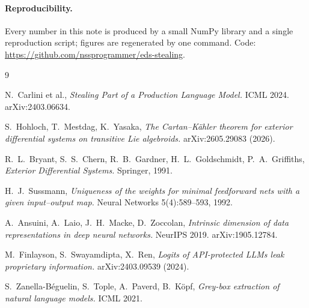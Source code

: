 \documentclass[11pt]{article}
\begin{document}
\paragraph{Reproducibility.} Every number in this note is produced by a small
NumPy library and a single reproduction script; figures are regenerated by one
command. Code: \url{https://github.com/nssprogrammer/eds-stealing}.

\begin{thebibliography}{9}

\label{ref:carlini}
N.~Carlini et al.,
\textit{Stealing Part of a Production Language Model.}
ICML 2024. arXiv:2403.06634.

\label{ref:eds}
S.~Hohloch, T.~Mestdag, K.~Yasaka,
\textit{The Cartan--K\"ahler theorem for exterior differential systems on
transitive Lie algebroids.} arXiv:2605.29083 (2026).

\label{ref:bryant}
R.~L.~Bryant, S.~S.~Chern, R.~B.~Gardner, H.~L.~Goldschmidt, P.~A.~Griffiths,
\textit{Exterior Differential Systems.} Springer, 1991.

\label{ref:sussmann}
H.~J.~Sussmann,
\textit{Uniqueness of the weights for minimal feedforward nets with a given
input--output map.} Neural Networks 5(4):589--593, 1992.

\label{ref:ansuini}
A.~Ansuini, A.~Laio, J.~H.~Macke, D.~Zoccolan,
\textit{Intrinsic dimension of data representations in deep neural networks.}
NeurIPS 2019. arXiv:1905.12784.

\label{ref:finlayson}
M.~Finlayson, S.~Swayamdipta, X.~Ren,
\textit{Logits of API-protected LLMs leak proprietary information.}
arXiv:2403.09539 (2024).

\label{ref:zanella}
S.~Zanella-B\'eguelin, S.~Tople, A.~Paverd, B.~K\"opf,
\textit{Grey-box extraction of natural language models.} ICML 2021.

\end{thebibliography}
\end{document}
